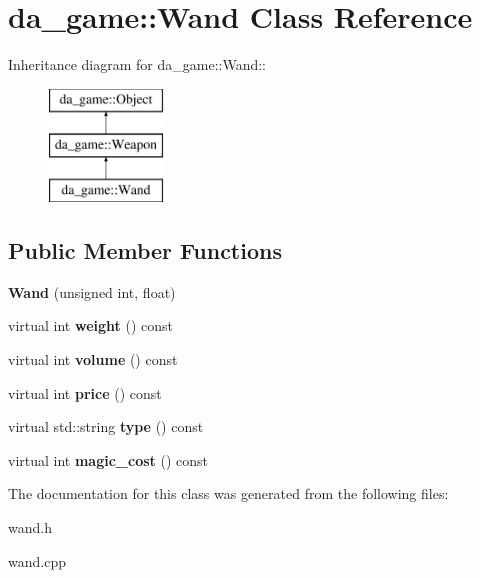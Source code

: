 \hypertarget{classda__game_1_1Wand}{
\section{da\_\-game::Wand Class Reference}
\label{classda__game_1_1Wand}
}
Inheritance diagram for da\_\-game::Wand::\begin{figure}[H]
\begin{center}
\leavevmode
\includegraphics[height=3cm]{classda__game_1_1Wand}
\end{center}
\end{figure}
\subsection*{Public Member Functions}
\begin{DoxyCompactItemize}
\item 
\hypertarget{classda__game_1_1Wand_ae558206db7df170d40b3dfb32b1ce4cd}{
{\bfseries Wand} (unsigned int, float)}
\label{classda__game_1_1Wand_ae558206db7df170d40b3dfb32b1ce4cd}

\item 
\hypertarget{classda__game_1_1Wand_a20d019963c6c21c8b98c8cfd67e4edad}{
virtual int {\bfseries weight} () const }
\label{classda__game_1_1Wand_a20d019963c6c21c8b98c8cfd67e4edad}

\item 
\hypertarget{classda__game_1_1Wand_a85feab0eb776970c6b4ccd1d0bbd012f}{
virtual int {\bfseries volume} () const }
\label{classda__game_1_1Wand_a85feab0eb776970c6b4ccd1d0bbd012f}

\item 
\hypertarget{classda__game_1_1Wand_ac6d0ee9dddccc7b8b4a65ad1e137c2da}{
virtual int {\bfseries price} () const }
\label{classda__game_1_1Wand_ac6d0ee9dddccc7b8b4a65ad1e137c2da}

\item 
\hypertarget{classda__game_1_1Wand_ada77c13289de7d6a7ce00c39827c3023}{
virtual std::string {\bfseries type} () const }
\label{classda__game_1_1Wand_ada77c13289de7d6a7ce00c39827c3023}

\item 
\hypertarget{classda__game_1_1Wand_a9ae78043a8d08b22cb608b360f491ab3}{
virtual int {\bfseries magic\_\-cost} () const }
\label{classda__game_1_1Wand_a9ae78043a8d08b22cb608b360f491ab3}

\end{DoxyCompactItemize}


The documentation for this class was generated from the following files:\begin{DoxyCompactItemize}
\item 
wand.h\item 
wand.cpp\end{DoxyCompactItemize}
